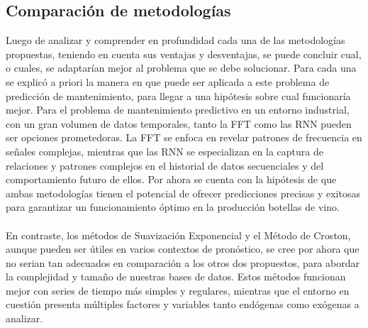 \documentclass[10pt]{article}
\begin{document}


\subsection{Comparación de metodologías}

Luego de analizar y comprender en profundidad cada una de las metodologías propuestas, teniendo en cuenta sus ventajas y desventajas, se puede concluir cual, o cuales, se adaptarían mejor al problema que se debe solucionar. Para cada una se explicó a priori la manera en que puede ser aplicada a este problema de predicción de mantenimiento, para llegar a una hipótesis sobre cual funcionaría mejor. Para el problema de mantenimiento predictivo en un entorno industrial, con un gran volumen de datos temporales, tanto la FFT como las RNN pueden ser opciones prometedoras. La FFT se enfoca en revelar patrones de frecuencia en señales complejas, mientras que las RNN se especializan en la captura de relaciones y patrones complejos en el historial de datos secuenciales y del comportamiento futuro de ellos. Por ahora se cuenta con la hipótesis de que ambas metodologías tienen el potencial de ofrecer predicciones precisas y exitosas para garantizar un funcionamiento óptimo en la producción botellas de vino.\\
\\
En contraste, los métodos de Suavización Exponencial y el Método de Croston, aunque pueden ser útiles en varios contextos de pronóstico, se cree por ahora que no serian tan adecuados en comparación a los otros dos propuestos, para abordar la complejidad y tamaño de nuestras bases de datos. Estos métodos funcionan mejor con series de tiempo más simples y regulares, mientras que el entorno en cuestión presenta múltiples factores y variables tanto endógenas como exógenas a analizar. 
\end{document}
